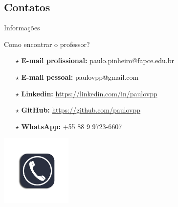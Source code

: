 \documentclass{beamer}
\begin{document}
\subsection{Contatos}
%
\begin{frame}{Informações}
    \begin{block}{Como encontrar o professor?}
        \begin{itemize}
            \item [$\star$] \textbf{E-mail profissional:} paulo.pinheiro@fapce.edu.br\\
            \item [$\star$] \textbf{E-mail pessoal:} paulovpp@gmail.com\\
            \item [$\star$] \textbf{Linkedin:} \url{https://linkedin.com/in/paulovpp}\\
            \item [$\star$] \textbf{GitHub:} \url{https://github.com/paulovpp}\\
            \item [$\star$] \textbf{WhatsApp:} +55 88 9 9723-6607
        \end{itemize}
    \end{block}
    \centering
    \includegraphics[height=3.5cm]{contato.png}
\end{frame}



\end{document}
